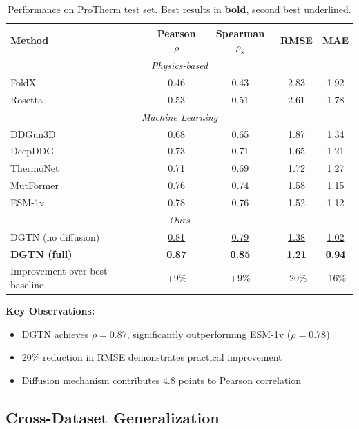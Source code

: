 \documentclass[12pt,en]{elegantpaper}
\begin{document}
\begin{table}[htbp]
\centering
\caption{Performance on ProTherm test set. Best results in \textbf{bold}, second best \underline{underlined}.}
\label{tab:main_results}
\begin{tabular}{lcccc}
\toprule
\textbf{Method} & \textbf{Pearson} $\rho$ & \textbf{Spearman} $\rho_s$ & \textbf{RMSE} & \textbf{MAE} \\
\midrule
\multicolumn{5}{c}{\textit{Physics-based}} \\
FoldX & 0.46 & 0.43 & 2.83 & 1.92 \\
Rosetta & 0.53 & 0.51 & 2.61 & 1.78 \\
\midrule
\multicolumn{5}{c}{\textit{Machine Learning}} \\
DDGun3D & 0.68 & 0.65 & 1.87 & 1.34 \\
DeepDDG & 0.73 & 0.71 & 1.65 & 1.21 \\
ThermoNet & 0.71 & 0.69 & 1.72 & 1.27 \\
MutFormer & 0.76 & 0.74 & 1.58 & 1.15 \\
ESM-1v & 0.78 & 0.76 & 1.52 & 1.12 \\
\midrule
\multicolumn{5}{c}{\textit{Ours}} \\
DGTN (no diffusion) & \underline{0.81} & \underline{0.79} & \underline{1.38} & \underline{1.02} \\
\textbf{DGTN (full)} & \textbf{0.87} & \textbf{0.85} & \textbf{1.21} & \textbf{0.94} \\
\midrule
Improvement over best baseline & +9\% & +9\% & -20\% & -16\% \\
\bottomrule
\end{tabular}
\end{table}

\textbf{Key Observations:}
\begin{itemize}
    \item DGTN achieves $\rho=0.87$, significantly outperforming ESM-1v ($\rho=0.78$)
    \item 20\% reduction in RMSE demonstrates practical improvement
    \item Diffusion mechanism contributes 4.8 points to Pearson correlation
\end{itemize}

\subsection{Cross-Dataset Generalization}
\end{document}
